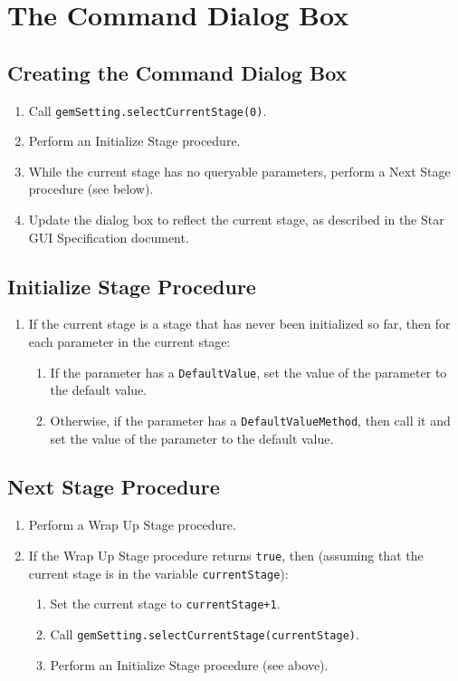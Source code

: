 \documentclass[11pt]{article}
\begin{document}
\section{The Command Dialog Box}

\subsection{Creating the Command Dialog Box}

\begin{enumerate}
\item Call {\tt gemSetting.selectCurrentStage(0)}.
\item Perform an Initialize Stage procedure.
\item While the current stage has no queryable parameters, perform
  a Next Stage procedure (see below).
\item Update the dialog box to reflect the current stage, as described
  in the Star GUI Specification document.
\end{enumerate}

\subsection{Initialize Stage Procedure}

\begin{enumerate}
\item If the current stage is a stage that has never been initialized so far,
  then for each parameter in the current stage:
  \begin{enumerate}
  \item If the parameter has a {\tt DefaultValue}, set the value of the
    parameter to the default value.
  \item Otherwise, if the parameter has a {\tt DefaultValueMethod}, then call it
    and set the value of the parameter to the default value.
  \end{enumerate}
\end{enumerate}

\subsection{Next Stage Procedure}

\begin{enumerate}
\item Perform a Wrap Up Stage procedure.
\item If the Wrap Up Stage procedure returns {\tt true}, then (assuming
  that the current stage is in the variable {\tt currentStage}):
  \begin{enumerate}
  \item Set the current stage to \verb/currentStage+1/.
  \item Call {\tt gemSetting.selectCurrentStage(currentStage)}.
  \item Perform an Initialize Stage procedure (see above).
  \end{enumerate}
\end{enumerate}
\end{document}
